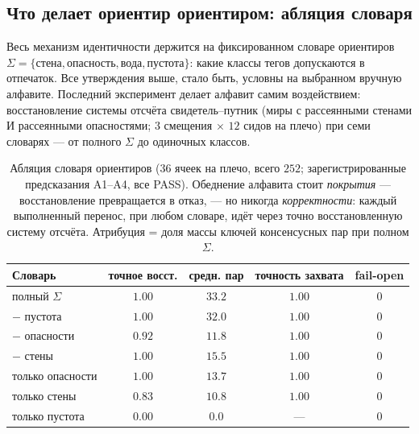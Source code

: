 \documentclass{article}
\begin{document}
\subsection{Что делает ориентир ориентиром: абляция словаря}
\label{sec:ablation}

Весь механизм идентичности держится на фиксированном словаре
ориентиров $\Sigma = \{\texttt{стена}, \texttt{опасность},
\texttt{вода}, \texttt{пустота}\}$: какие классы тегов допускаются в
отпечаток. Все утверждения выше, стало быть, условны на выбранном
вручную алфавите. Последний эксперимент делает алфавит самим
воздействием: восстановление системы отсчёта свидетель--путник (миры
с рассеянными стенами И рассеянными опасностями; $3$ смещения
$\times$ $12$ сидов на плечо) при семи словарях --- от полного
$\Sigma$ до одиночных классов.

\begin{table}[h]
\centering
\caption{Абляция словаря ориентиров ($36$ ячеек на плечо, всего $252$;
зарегистрированные предсказания A1--A4, все PASS). Обеднение алфавита
стоит \emph{покрытия} --- восстановление превращается в отказ, --- но
никогда \emph{корректности}: каждый выполненный перенос, при любом
словаре, идёт через точно восстановленную систему отсчёта. Атрибуция
= доля массы ключей консенсусных пар при полном $\Sigma$.}
\label{tab:ablation}
\small
\begin{tabular}{lcccc}
\toprule
Словарь & точное восст. & средн. пар & точность захвата & fail-open \\
\midrule
полный $\Sigma$ & $1.00$ & $33.2$ & $1.00$ & $0$ \\
$-$ пустота & $1.00$ & $32.0$ & $1.00$ & $0$ \\
$-$ опасности & $0.92$ & $11.8$ & $1.00$ & $0$ \\
$-$ стены & $1.00$ & $15.5$ & $1.00$ & $0$ \\
только опасности & $1.00$ & $13.7$ & $1.00$ & $0$ \\
только стены & $0.83$ & $10.8$ & $1.00$ & $0$ \\
только пустота & $0.00$ & $0.0$ & --- & $0$ \\
\bottomrule
\end{tabular}
\end{table}
\end{document}
